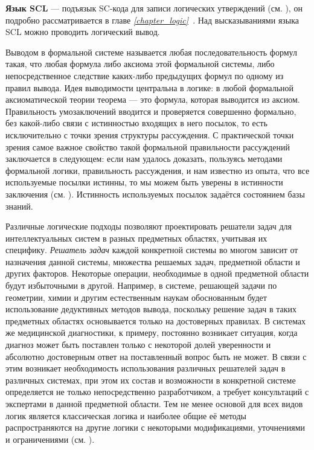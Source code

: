 \textbf{Язык SCL} — подъязык SC-кода для записи логических утверждений (см. ), он подробно рассматривается в главе \textit{\ref{chapter_logic}~}. Над высказываниями языка SCL можно проводить логический вывод.

Выводом в формальной системе называется любая последовательность формул такая, что любая формула либо аксиома этой формальной системы, либо непосредственное следствие каких-либо предыдущих формул по одному из правил вывода. Идея выводимости центральна в логике: в любой формальной аксиоматической теории теорема --- это формула, которая выводится из аксиом. Правильность умозаключений вводится и проверяется совершенно формально, без какой-либо связи с истинностью входящих в него посылок, то есть исключительно с точки зрения структуры рассуждения. С практической точки зрения самое важное свойство такой формальной правильности рассуждений заключается в следующем: если нам удалось доказать, пользуясь методами формальной логики, правильность рассуждения, и нам известно из опыта, что все используемые посылки истинны, то мы можем быть уверены в истинности заключения (см. ). Истинность используемых посылок задаётся состоянием базы знаний.

Различные логические подходы позволяют проектировать решатели задач для интеллектуальных систем в разных предметных областях, учитывая их специфику. \textit{Решатель задач} каждой конкретной системы во многом зависит от назначения данной системы, множества решаемых задач, предметной области и других факторов. Некоторые операции, необходимые в одной предметной области будут избыточными в другой. Например, в системе, решающей задачи по геометрии, химии и другим естественным наукам обоснованным будет использование дедуктивных методов вывода, поскольку решение задач в таких предметных областях основывается только на достоверных правилах. В системах же медицинской диагностики, к примеру, постоянно возникает ситуация, когда диагноз может быть поставлен только с некоторой долей уверенности и абсолютно достоверным ответ на поставленный вопрос быть не может. В связи с этим возникает необходимость использования различных решателей задач в различных системах, при этом их состав и возможности в конкретной системе определяется не только непосредственно разработчиком, а требует консультаций с экспертами в данной предметной области. Тем не менее основой для всех видов логик является классическая логика и наиболее общие её методы распространяются на другие логики с некоторыми модификациями, уточнениями и ограничениями (см. ).

